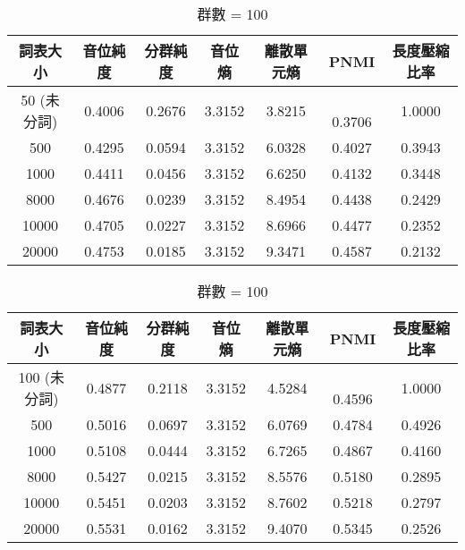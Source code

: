 \begin{table}[!htbp]
    \centering
    \begin{subtable}[t]{\textwidth}
        \centering
        \begin{tabular}{|c|c|c|c|c|c|c|} \hline 
                詞表大小  & 音位純度 & 分群純度 & 音位熵 & 離散單元熵 &    PNMI & 長度壓縮比率 \\ \hline 
 50 (未分詞)&  0.4006 &   0.2676 & 3.3152 &     3.8215 &　0.3706&1.0000\\ \hline 
                  500  &   0.4295&     0.0594    &3.3152 &   6.0328  &       0.4027 &0.3943 \\ \hline %
                 1000  &   0.4411&     0.0456    &3.3152 &   6.6250  &       0.4132 &0.3448 \\ \hline %
                 8000  &   0.4676&     0.0239    &3.3152 &   8.4954  &       0.4438 &0.2429 \\ \hline %
                10000  &   0.4705&     0.0227    &3.3152 &   8.6966  &       0.4477 &0.2352 \\ \hline %
                20000  &   0.4753&     0.0185    &3.3152 &   9.3471  &       0.4587 &0.2132 \\ \hline %
        \end{tabular}
\caption{群數 = 50}
        \label{tab:ch4-w2v2-phn-clu050}
    \end{subtable}        

    \vspace{0.01cm}        

    \begin{subtable}[t]{\textwidth}
        \centering
        \begin{tabular}{|c|c|c|c|c|c|c|} \hline 
                詞表大小  & 音位純度 & 分群純度 & 音位熵 & 離散單元熵 &    PNMI & 長度壓縮比率 \\ \hline 
 100 (未分詞)&0.4877 &   0.2118 & 3.3152 &     4.5284 &　0.4596&1.0000\\ \hline 
                  500  &   0.5016&     0.0697    &3.3152 &   6.0769  &       0.4784 &0.4926 \\ \hline %
                 1000  &   0.5108&     0.0444    &3.3152 &   6.7265  &       0.4867 &0.4160 \\ \hline %
                 8000  &   0.5427&     0.0215    &3.3152 &   8.5576  &       0.5180 &0.2895 \\ \hline %
                10000  &   0.5451&     0.0203    &3.3152 &   8.7602  &       0.5218 &0.2797 \\ \hline %
                20000  &   0.5531&     0.0162    &3.3152 &   9.4070  &       0.5345 &0.2526 \\ \hline %
        \end{tabular}
\caption{群數 = 100}
        \label{tab:ch4-w2v2-phn-clu100}
    \end{subtable}        


\end{table}
